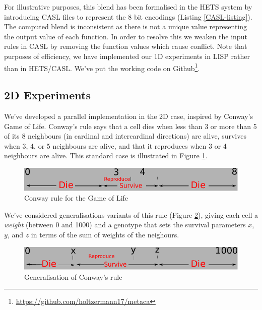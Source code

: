 \documentclass{AISB2008}
\begin{document}
For illustrative purposes, this blend has been formalised in the HETS
system \cite{mossakowski2007heterogeneous} by introducing CASL files
to represent the 8 bit encodings (Listing \ref{CASL-listing}).
%
The computed blend is inconsistent as there is not a unique value
representing the output value of each function.  In order to resolve
this we weaken the input rules in CASL by removing the function values
which cause conflict.
%
Note that purposes of efficiency, we have implemented our 1D
experiments in LISP rather than in \mbox{HETS}/\mbox{CASL}.  We've put
the working code on
Github\footnote{\url{https://github.com/holtzermann17/metaca}}.


\subsection{2D Experiments} \label{2d-experiments-design}

We've developed a parallel implementation in the 2D case, inspired by
Conway's Game of Life.  Conway's rule says that a cell dies when less
than 3 or more than 5 of its 8 neighbours (in cardinal and
intercardinal directions) are alive, survives when 3, 4, or 5
neighbours are alive, and that it reproduces when 3 or 4 neighbours
are alive.  This standard case is illustrated in Figure
\ref{conway-rule}.

\begin{figure}[!ht]
\includegraphics[width=\columnwidth]{conway}
\caption{Conway rule for the Game of Life\label{conway-rule}}
\end{figure}

We've considered generalisations variants of this rule (Figure
\ref{generalised-conway-rule}), giving each cell a \emph{weight}
(between 0 and 1000) and a genotype that sets the survival parameters
$x$, $y$, and $z$ in terms of the sum of weights of the neighours.
\begin{figure}[!ht]
\includegraphics[width=\columnwidth]{2dgenotype}
\caption{Generalisation of Conway's rule\label{generalised-conway-rule}}
\end{figure}
\end{document}
